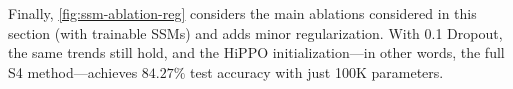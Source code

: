 Finally, \cref{fig:ssm-ablation-reg} considers the main ablations considered in this section (with trainable SSMs) and adds minor regularization.
With 0.1 Dropout, the same trends still hold, and the HiPPO initialization---in other words, the full S4 method---achieves \( 84.27\% \) test accuracy with just 100K parameters.
